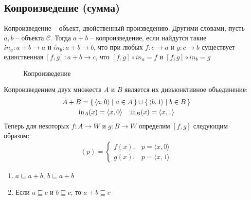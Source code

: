 


\subsection{Копроизведение (сумма)}
\begin{defn}
  Копроизведение -- объект, двойственный произведению. Другими словами,
  пусть $a, b$ -- объекта $\mathcal{C}$. Тогда $a + b$ -- копроизведение, если
  найдутся такие $in_a \colon a + b \to a$ и $in_b \colon a + b \to b$, что при
  любых $f \colon c \to a$ и $g \colon c \to b$ существует единственная $[f, g]
  \colon a + b \to c$, что $[f, g] \circ in_a = f$ и $[f, g] \circ in_b = g$ 
\end{defn}
\begin{figure}[h]
  \centering
  \caption{Копроизведение}
  \label{fig:coproduct}
\end{figure}
\begin{exm}
  Копроизведением двух множеств $A$ и $B$ является их дизъюнктивное объединение:
  \begin{gather*}
    A + B = \{\, \langle {a, 0} \rangle \mid a \in A \,\}
      \cup \{\, \langle {b, 1} \rangle \mid b \in B \,\} \\
    \operatorname{in}_A(x) = \langle {x, 0} \rangle \quad
    \operatorname{in}_B(x) = \langle {x, 1} \rangle \\
  \end{gather*}
  Теперь для некоторых $f \colon A \to W$ и $g \colon B \to W$ определим $[f, g]$
  следующим образом:
  \begin{gather*}
    [f, g](p) = \begin{cases}
      f(x), & p = \langle {x, 0} \rangle \\
      g(x), & p = \langle {x, 1} \rangle
    \end{cases}
  \end{gather*}
\end{exm}
\begin{exm}
  \leavevmode
  \begin{enumerate}
    \item $a \sqsubseteq a + b$, $b \sqsubseteq a + b$
    \item Если $a \sqsubseteq c$ и $ b \sqsubseteq c$, то $ a + b \sqsubseteq c$
  \end{enumerate}
\end{exm}

